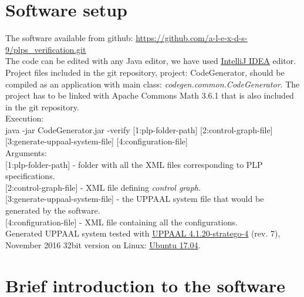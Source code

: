 \section{Software setup}
The software available from github: \href{https://github.com/a-l-e-x-d-s-9/plps_verification.git}{\ul{https://github.com/a-l-e-x-d-s-9/plps_verification.git}}\\
The code can be edited with any Java editor, we have used \href{https://www.jetbrains.com/idea/download}{\ul{IntelliJ IDEA}} editor. Project files included in the git repository, project: CodeGenerator, should be compiled as an application with main class: \textit{codegen.common.CodeGenerator}. The project has to be linked with Apache Commons Math 3.6.1 that is also included in the git repository. \\
Execution:\\
        java -jar CodeGenerator.jar -verify \small[1:plp-folder-path\small] \small[2:control-graph-file\small] \small[3:generate-uppaal-system-file\small] \small[4:configuration-file\small]\\
Arguments:\\
\small[1:plp-folder-path\small] - folder with all the XML files corresponding to PLP specifications.\\
\small[2:control-graph-file\small] - XML file defining \textit{control graph}. \\
\small[3:generate-uppaal-system-file\small] - the UPPAAL system file that would be generated by the software. \\
\small[4:configuration-file\small] - XML file containing all the configurations. \\
Generated UPPAAL system tested with \href{http://people.cs.aau.dk/~marius/stratego/download.html\#download}{\ul{UPPAAL 4.1.20-stratego-4}} (rev. 7), November 2016 32bit version on Linux: \href{http://releases.ubuntu.com/17.04/}{\ul{Ubuntu 17.04}}.\\
\section{Brief introduction to the software}
